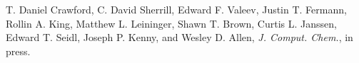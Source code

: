 T. Daniel Crawford, C. David Sherrill, Edward F. Valeev, Justin
T. Fermann, Rollin A. King, Matthew L. Leininger, Shawn T. Brown,
Curtis L. Janssen, Edward T. Seidl, Joseph P. Kenny, and Wesley D. Allen,
{\em J. Comput. Chem.}, in press.
